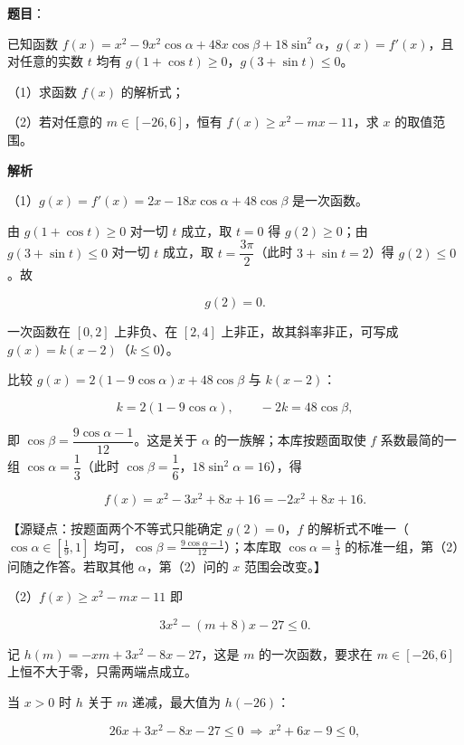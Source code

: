 \begin{answer}

\textbf{题目}：

已知函数 $f(x)=x^2-9x^2\cos\alpha+48x\cos\beta+18\sin^2\alpha$，$g(x)=f'(x)$，且对任意的实数 $t$ 均有 $g(1+\cos t)\geqslant0$，$g(3+\sin t)\leqslant0$。

（1）求函数 $f(x)$ 的解析式；

（2）若对任意的 $m\in[-26,6]$，恒有 $f(x)\geqslant x^2-mx-11$，求 $x$ 的取值范围。

\textbf{解析}

（1）$g(x)=f'(x)=2x-18x\cos\alpha+48\cos\beta$ 是一次函数。

由 $g(1+\cos t)\geqslant0$ 对一切 $t$ 成立，取 $t=0$ 得 $g(2)\geqslant0$；由 $g(3+\sin t)\leqslant0$ 对一切 $t$ 成立，取 $t=\dfrac{3\pi}2$（此时 $3+\sin t=2$）得 $g(2)\leqslant0$。故

\nopagebreak[4]
\[g(2)=0.\]

一次函数在 $[0,2]$ 上非负、在 $[2,4]$ 上非正，故其斜率非正，可写成 $g(x)=k(x-2)$（$k\leqslant0$）。

比较 $g(x)=2(1-9\cos\alpha)x+48\cos\beta$ 与 $k(x-2)$：

\nopagebreak[4]
\[k=2(1-9\cos\alpha),\qquad -2k=48\cos\beta,\]

即 $\cos\beta=\dfrac{9\cos\alpha-1}{12}$。这是关于 $\alpha$ 的一族解；本库按题面取使 $f$ 系数最简的一组 $\cos\alpha=\dfrac13$（此时 $\cos\beta=\dfrac16$，$18\sin^2\alpha=16$），得

\nopagebreak[4]
\[f(x)=x^2-3x^2+8x+16=-2x^2+8x+16.\]

【源疑点：按题面两个不等式只能确定 $g(2)=0$，$f$ 的解析式不唯一（$\cos\alpha\in\left[\frac19,1\right]$ 均可，$\cos\beta=\frac{9\cos\alpha-1}{12}$）；本库取 $\cos\alpha=\frac13$ 的标准一组，第（2）问随之作答。若取其他 $\alpha$，第（2）问的 $x$ 范围会改变。】

（2）$f(x)\geqslant x^2-mx-11$ 即

\nopagebreak[4]
\[3x^2-(m+8)x-27\leqslant0.\]

记 $h(m)=-xm+3x^2-8x-27$，这是 $m$ 的一次函数，要求在 $m\in[-26,6]$ 上恒不大于零，只需两端点成立。

当 $x>0$ 时 $h$ 关于 $m$ 递减，最大值为 $h(-26)$：

\nopagebreak[4]
\[26x+3x^2-8x-27\leqslant0\ \Rightarrow\ x^2+6x-9\leqslant0,\]


\end{answer}
